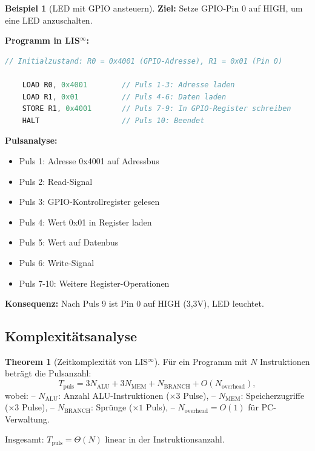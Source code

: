 \documentclass[a4paper,12pt]{article}
\theoremstyle{definition}
\newtheorem{theorem}{Theorem}
\newtheorem{beispiel}{Beispiel}
\begin{document}
\begin{beispiel}[LED mit GPIO ansteuern]
	\label{bsp:led_gpio}
	\textbf{Ziel:} Setze GPIO-Pin 0 auf HIGH, um eine LED anzuschalten.
	
	\textbf{Programm in LIS$^{\infty}$:}
	\begin{lstlisting}[language=C]
	// Initialzustand: R0 = 0x4001 (GPIO-Adresse), R1 = 0x01 (Pin 0)
	
	LOAD R0, 0x4001        // Puls 1-3: Adresse laden
	LOAD R1, 0x01          // Puls 4-6: Daten laden
	STORE R1, 0x4001       // Puls 7-9: In GPIO-Register schreiben
	HALT                   // Puls 10: Beendet
	\end{lstlisting}
	
	\textbf{Pulsanalyse:}
	\begin{itemize}
		\item Puls 1: Adresse 0x4001 auf Adressbus
		\item Puls 2: Read-Signal
		\item Puls 3: GPIO-Kontrollregister gelesen
		\item Puls 4: Wert 0x01 in Register laden
		\item Puls 5: Wert auf Datenbus
		\item Puls 6: Write-Signal
		\item Puls 7-10: Weitere Register-Operationen
	\end{itemize}
	
	\textbf{Konsequenz:} Nach Puls 9 ist Pin 0 auf HIGH (3,3V), LED leuchtet.
\end{beispiel}

\subsection{Komplexitätsanalyse}

\begin{theorem}[Zeitkomplexität von LIS$^{\infty}$]
	\label{thm:complexity}
	Für ein Programm mit $N$ Instruktionen beträgt die Pulsanzahl:
	\[
	T_{\text{puls}} = 3N_{\text{ALU}} + 3N_{\text{MEM}} + N_{\text{BRANCH}} + O(N_{\text{overhead}}),
	\]
	wobei:
	-- $N_{\text{ALU}}$: Anzahl ALU-Instruktionen ($\times 3$ Pulse),
	-- $N_{\text{MEM}}$: Speicherzugriffe ($\times 3$ Pulse),
	-- $N_{\text{BRANCH}}$: Sprünge ($\times 1$ Puls),
	-- $N_{\text{overhead}} = O(1)$ für PC-Verwaltung.
	
	Insgesamt: $T_{\text{puls}} = \Theta(N)$ linear in der Instruktionsanzahl.
\end{theorem}
\end{document}
